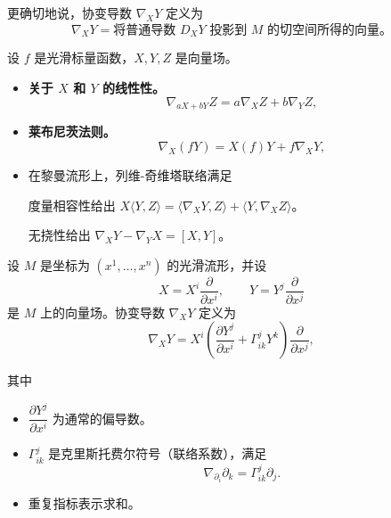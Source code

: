 更确切地说，协变导数 $\nabla_XY$ 定义为%
%
\[
  \nabla_XY=\text{将普通导数 $D_XY$ 投影到 $M$ 的切空间所得的向量。}
\]

设 $f$ 是光滑标量函数，$X,Y,Z$ 是向量场。
\begin{itemize}
\item \textbf{关于 $X$ 和 $Y$ 的线性性。}
\begin{equation*}
  \nabla_{aX+bY}Z=a\nabla_XZ+b\nabla_YZ,
  \tag{6A13}\label{eq:6A13}
\end{equation*}
\item \textbf{莱布尼茨法则。}
\begin{equation*}
  \nabla_X(fY)=X(f)Y+f\nabla_XY,
  \tag{6A14}\label{eq:6A14}
\end{equation*}
\item 在黎曼流形上，列维-奇维塔联络满足

度量相容性给出 $X\langle Y,Z\rangle=\langle\nabla_XY,Z\rangle+\langle Y,\nabla_XZ\rangle$。

无挠性给出 $\nabla_XY-\nabla_YX=[X,Y]$。
\end{itemize}

设 $M$ 是坐标为 $(x^1,\dots,x^n)$ 的光滑流形，并设
\[
  X=X^i\frac{\partial}{\partial x^i},\qquad
  Y=Y^j\frac{\partial}{\partial x^j}
\]
是 $M$ 上的向量场。协变导数 $\nabla_XY$ 定义为
\begin{equation*}
  \nabla_XY=X^i\left(\frac{\partial Y^j}{\partial x^i}+\Gamma^j_{ik}Y^k\right)
    \frac{\partial}{\partial x^j},
  \tag{6A15}\label{eq:6A15}
\end{equation*}

其中
\begin{itemize}
\item $\dfrac{\partial Y^j}{\partial x^i}$ 为通常的偏导数。
\item $\Gamma^j_{ik}$ 是克里斯托费尔符号（联络系数），满足
\begin{equation*}
  \nabla_{\partial_i}\partial_k=\Gamma^j_{ik}\partial_j.
  \tag{6A16}\label{eq:6A16}
\end{equation*}
\item 重复指标表示求和。
\end{itemize}

